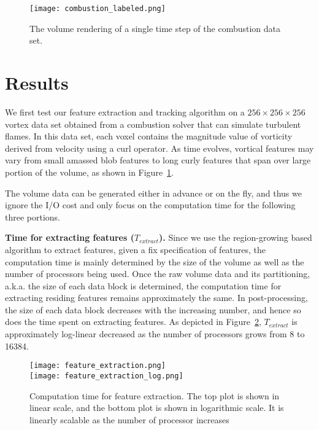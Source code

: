 \begin{figure}[t]
\texttt{[image: combustion\_labeled.png]}
\caption{The volume rendering of a single time step of the combustion data set.}
\label{fig:combustion-labeled}
\end{figure}

\section{Results}

We first test our feature extraction and tracking algorithm on a $256\times256\times256$ vortex data set obtained from a combustion solver that can simulate turbulent flames. In this data set, each voxel contains the magnitude value of vorticity derived from velocity using a curl operator. As time evolves, vortical features may vary from small amassed blob features to long curly features that span over large portion of the volume, as shown in Figure~\ref{fig:combustion-labeled}.


The volume data can be generated either in advance or on the fly, and thus we ignore the I/O cost and only focus on the computation time for the following three portions.

\textbf{Time for extracting features ($T_{extract}$).}
%
Since we use the region-growing based algorithm to extract features, given a fix specification of features, the computation time is mainly determined by the size of the volume as well as the number of processors being used. Once the raw volume data and its partitioning, a.k.a. the size of each data block is determined, the computation time for extracting residing features remains approximately the same. In post-processing, the size of each data block decreases with the increasing number, and hence so does the time spent on extracting features. As depicted in Figure~\ref{fig:feature-extraction}, $T_{extract}$ is approximately log-linear decreased as the number of processors grows from 8 to 16384.

\begin{figure}[t]
\centering
\texttt{[image: feature\_extraction.png]}\\
\texttt{[image: feature\_extraction\_log.png]}
\caption{Computation time for feature extraction. The top plot is shown in linear scale, and the bottom plot is shown in logarithmic scale. It is linearly scalable as the number of processor increases}
\label{fig:feature-extraction}
\end{figure}

